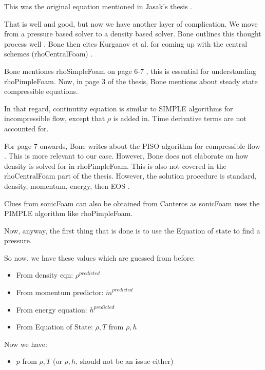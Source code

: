 \documentclass[masters]{ucbthesis}
\renewcommand{\_}{\kern-1.5pt\textunderscore\kern-1.5pt}
\begin{document}
This was the original equation mentioned in Jasak's thesis 
\citep{jasak1996error}.

That is well and good, but now we have another layer of complication.
We move from a pressure based solver to a density based solver.
Bone outlines this thought process well \citep{bone2020comparative}.
Bone then cites Kurganov et al. for coming up with the 
central schemes (rhoCentralFoam) \citep{kurganov2000new}.

Bone mentiones rhoSimpleFoam on page 6-7 \citep{bone2020comparative}, 
this is essential for understanding rhoPimpleFoam. Now, in page 3 of 
the thesis, Bone mentions about steady state compressible equations.

In that regard, continutity equation is similar to SIMPLE algorithms
for incompressible flow, except that $\rho$ is added in. Time derivative 
terms are not accounted for.

For page 7 onwards, Bone writes about the PISO algorithm for compressible 
flow \citep{bone2020comparative}. This is more relevant to our case.
However, Bone does not elaborate on how density is solved for in 
rhoPimpleFoam. This is also not covered in the rhoCentralFoam part of the 
thesis. However, the solution procedure is standard, density, momentum,
energy, then EOS \citep{bone2020comparative}. 

Clues from sonicFoam can also be obtained from Canteros 
\citep{canteros2024review} as sonicFoam uses the PIMPLE algorithm like 
rhoPimpleFoam.


Now, anyway, the first thing that is done is to use the Equation of 
state to find a pressure.

So now, we have these values which are guessed from before:

\begin{itemize}
	\item From density eqn: $\rho^{predicted}$
	\item From momentum predictor: $\dot{m}^{predicted}$
	\item From energy equation: $h^{predicted}$
	\item From Equation of State: $\rho,T$ from $\rho, h$
\end{itemize}

Now we have:

\begin{itemize}
	\item $p$ from $\rho, T$ (or $\rho,h$, should not be an issue either)
\end{itemize}
\end{document}
